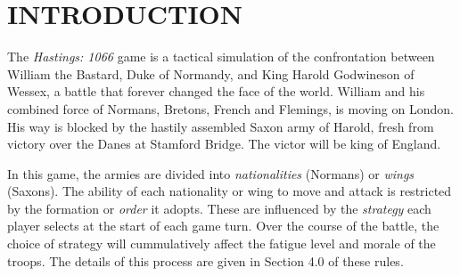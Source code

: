 \newpage
\section{INTRODUCTION}
\hfill

The \textit{Hastings: 1066} game is a tactical simulation of the confrontation between William the Bastard, Duke of Normandy, and King Harold Godwineson of Wessex, a battle that forever changed the face of the world. William and his combined force of Normans, Bretons, French and Flemings, is moving on London. His way is blocked by the hastily assembled Saxon army of Harold, fresh from victory over the Danes at Stamford Bridge. The victor will be king of England.

In this game, the armies are divided into \textit{nationalities} (Normans) or \textit{wings} (Saxons). The ability of each nationality or wing to move and attack is restricted by the formation or \textit{order} it adopts. These are influenced by the \textit{strategy} each player selects at the start of each game turn. Over the course of the battle, the choice of strategy will cummulatively affect the fatigue level and morale of the troops. The details of this process are given in Section 4.0 of these rules.